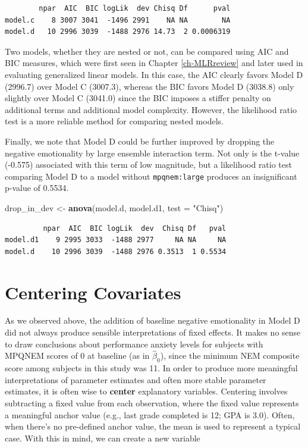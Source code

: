 \documentclass[
]{krantz}
\newenvironment{Shaded}{\begin{snugshade}}{\end{snugshade}}
\newcommand{\DataTypeTok}[1]{\textcolor[rgb]{0.27,0.27,0.27}{#1}}
\newcommand{\KeywordTok}[1]{\textcolor[rgb]{0.27,0.27,0.27}{\textbf{#1}}}
\newcommand{\NormalTok}[1]{#1}
\newcommand{\StringTok}[1]{\textcolor[rgb]{0.5,0.5,0.5}{#1}}
\begin{document}
\begin{verbatim}
        npar  AIC  BIC logLik  dev Chisq Df      pval
model.c    8 3007 3041  -1496 2991    NA NA        NA
model.d   10 2996 3039  -1488 2976 14.73  2 0.0006319
\end{verbatim}

Two models, whether they are nested or not, can be compared using AIC and BIC measures, which were first seen in Chapter \ref{ch-MLRreview} and later used in evaluating generalized linear models. In this case, the AIC clearly favors Model D (2996.7) over Model C (3007.3), whereas the BIC favors Model D (3038.8) only slightly over Model C (3041.0) since the BIC imposes a stiffer penalty on additional terms and additional model complexity. However, the likelihood ratio test is a more reliable method for comparing nested models.

Finally, we note that Model D could be further improved by dropping the negative emotionality by large ensemble interaction term. Not only is the t-value (-0.575) associated with this term of low magnitude, but a likelihood ratio test comparing Model D to a model without \texttt{mpqnem:large} produces an insignificant p-value of 0.5534.

\begin{Shaded}
\begin{Highlighting}[]
\NormalTok{drop_in_dev <-}\StringTok{ }\KeywordTok{anova}\NormalTok{(model.d, model.d1, }\DataTypeTok{test =} \StringTok{"Chisq"}\NormalTok{)}
\end{Highlighting}
\end{Shaded}

\begin{verbatim}
         npar  AIC  BIC logLik  dev  Chisq Df   pval
model.d1    9 2995 3033  -1488 2977     NA NA     NA
model.d    10 2996 3039  -1488 2976 0.3513  1 0.5534
\end{verbatim}

\hypertarget{sec:modele}{%
\section{Centering Covariates}\label{sec:modele}}

As we observed above, the addition of baseline negative emotionality in Model D did not always produce sensible interpretations of fixed effects. It makes no sense to draw conclusions about performance anxiety levels for subjects with MPQNEM scores of 0 at baseline (as in \(\hat{\beta}_{0}\)), since the minimum NEM composite score among subjects in this study was 11. In order to produce more meaningful interpretations of parameter estimates and often more stable parameter estimates, it is often wise to \textbf{center}  explanatory variables. Centering involves subtracting a fixed value from each observation, where the fixed value represents a meaningful anchor value (e.g., last grade completed is 12; GPA is 3.0). Often, when there's no pre-defined anchor value, the mean is used to represent a typical case. With this in mind, we can create a new variable
\end{document}
